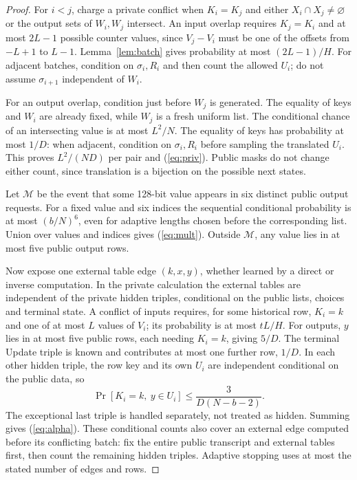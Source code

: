\documentclass[journal=tosc,preprint,floatrow,nohyperxmp]{iacrtrans}
\numberwithin{lemma}{section}
\numberwithin{proposition}{section}
\numberwithin{equation}{section}
\theoremstyle{definition}
\numberwithin{definition}{section}
\theoremstyle{plain}
\begin{document}
\begin{proof}
For $i<j$, charge a private conflict when $K_i=K_j$ and either $X_i\cap X_j\ne\varnothing$ or the output sets of $W_i,W_j$ intersect. An input overlap requires $K_j=K_i$ and at most $2L-1$ possible counter values, since $V_j-V_i$ must be one of the offsets from $-L+1$ to $L-1$. Lemma~\ref{lem:batch} gives probability at most $(2L-1)/H$. For adjacent batches, condition on $\sigma_i,R_i$ and then count the allowed $U_i$; do not assume $\sigma_{i+1}$ independent of $W_i$.

For an output overlap, condition just before $W_j$ is generated. The equality of keys and $W_i$ are already fixed, while $W_j$ is a fresh uniform list. The conditional chance of an intersecting value is at most $L^2/N$. The equality of keys has probability at most $1/D$: when adjacent, condition on $\sigma_i,R_i$ before sampling the translated $U_i$. This proves $L^2/(ND)$ per pair and (\ref{eq:priv}). Public masks do not change either count, since translation is a bijection on the possible next states.

Let $\mathcal M$ be the event that some 128-bit value appears in six distinct public output requests. For a fixed value and six indices the sequential conditional probability is at most $(b/N)^6$, even for adaptive lengths chosen before the corresponding list. Union over values and indices gives (\ref{eq:mult}). Outside $\mathcal M$, any value lies in at most five public output rows.

Now expose one external table edge $(k,x,y)$, whether learned by a direct or inverse computation. In the private calculation the external tables are independent of the private hidden triples, conditional on the public lists, choices and terminal state. A conflict of inputs requires, for some historical row, $K_i=k$ and one of at most $L$ values of $V_i$; its probability is at most $tL/H$. For outputs, $y$ lies in at most five public rows, each needing $K_i=k$, giving $5/D$. The terminal Update triple is known and contributes at most one further row, $1/D$. In each other hidden triple, the row key and its own $U_i$ are independent conditional on the public data, so
\[
 \Pr[K_i=k,\ y\in U_i]\le\frac{3}{D(N-b-2)}.
\]
The exceptional last triple is handled separately, not treated as hidden. Summing gives (\ref{eq:alpha}). These conditional counts also cover an external edge computed before its conflicting batch: fix the entire public transcript and external tables first, then count the remaining hidden triples. Adaptive stopping uses at most the stated number of edges and rows.


\end{proof}
\end{document}
